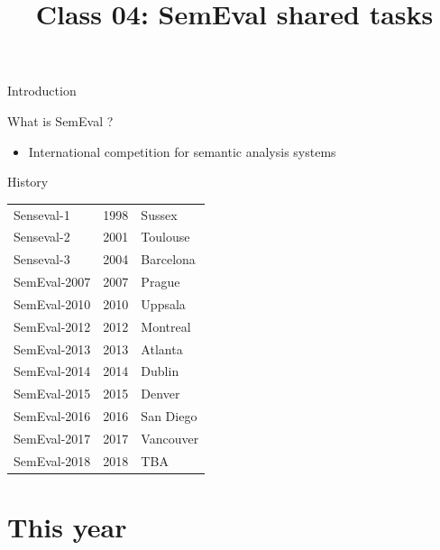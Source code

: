\documentclass[10pt, compress]{beamer}
\title{Class 04: SemEval shared tasks}
\begin{document}
\maketitle


\begin{frame}{Introduction}

What is SemEval ?
\begin{itemize}
  \item International competition for semantic analysis systems
\end{itemize}


\end{frame}


\begin{frame}{History}

\begin{tabular}{lrl}
Senseval-1  & 	1998    & Sussex   \\
Senseval-2  & 	2001    & Toulouse   \\
Senseval-3  & 	2004    & Barcelona   \\
SemEval-2007  & 	2007    & Prague   \\
SemEval-2010  & 	2010    & Uppsala   \\
SemEval-2012  & 	2012    & Montreal   \\
SemEval-2013  & 	2013    & Atlanta   \\
SemEval-2014  & 	2014    & Dublin   \\
SemEval-2015  & 	2015    & Denver   \\
SemEval-2016  & 	2016    & San Diego   \\
SemEval-2017  & 	2017    & Vancouver   \\
SemEval-2018  & 	2018    & TBA   \\
\end{tabular}

\end{frame}



\section{This year}
\end{document}
